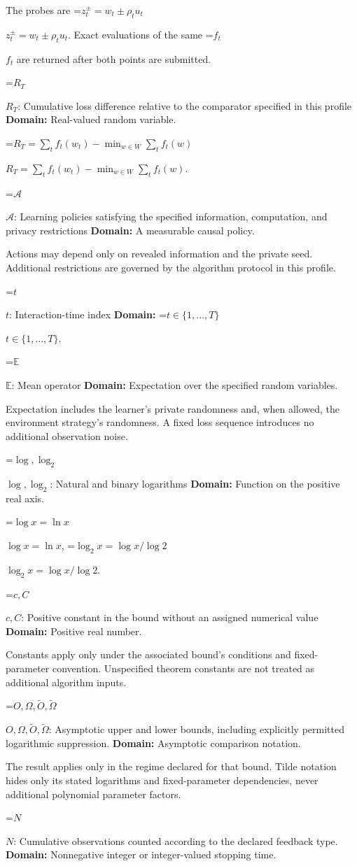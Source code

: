 \documentclass[10pt,a4paper]{article}
\newcommand{\AtlasMath}[1]{\par\begingroup\centering\setbox0=\hbox{$\displaystyle #1$}\ifdim\wd0>1.4\linewidth\typeout{ATLAS WIDE FORMULA: \the\wd0}\fi\ifdim\wd0>\linewidth\resizebox{\linewidth}{!}{\box0}\else\box0\fi\par\endgroup}
\newcommand{\AtlasInlineMath}[1]{\begingroup\setbox0=\hbox{$#1$}\ifdim\wd0>.4\linewidth\endgroup\AtlasMath{#1}\else\endgroup$#1$\fi}
\begin{document}
The probes are \AtlasInlineMath{z_t^\pm=w_t\pm\rho_tu_t}. Exact evaluations of the same \AtlasInlineMath{f_t} are returned after both points are submitted.

\AtlasInlineMath{R_T}: Cumulative loss difference relative to the comparator specified in this profile \textbf{Domain:} Real-valued random variable.

\AtlasInlineMath{R_T=\sum_tf_t(w_t)-\min_{w\in W}\sum_tf_t(w)}.

\AtlasInlineMath{\mathcal A}: Learning policies satisfying the specified information, computation, and privacy restrictions \textbf{Domain:} A measurable causal policy.

Actions may depend only on revealed information and the private seed. Additional restrictions are governed by the algorithm protocol in this profile.

\AtlasInlineMath{t}: Interaction-time index \textbf{Domain:} \AtlasInlineMath{t\in\{1,\ldots,T\}}.

\AtlasInlineMath{\mathbb E}: Mean operator \textbf{Domain:} Expectation over the specified random variables.

Expectation includes the learner's private randomness and, when allowed, the environment strategy's randomness. A fixed loss sequence introduces no additional observation noise.

\AtlasInlineMath{\log,\log_2}: Natural and binary logarithms \textbf{Domain:} Function on the positive real axis.

\AtlasInlineMath{\log x=\ln x}, \AtlasInlineMath{\log_2x=\log x/\log2}.

\AtlasInlineMath{c,C}: Positive constant in the bound without an assigned numerical value \textbf{Domain:} Positive real number.

Constants apply only under the associated bound’s conditions and fixed-parameter convention. Unspecified theorem constants are not treated as additional algorithm inputs.

\AtlasInlineMath{O,\Omega,\widetilde O,\widetilde\Omega}: Asymptotic upper and lower bounds, including explicitly permitted logarithmic suppression. \textbf{Domain:} Asymptotic comparison notation.

The result applies only in the regime declared for that bound. Tilde notation hides only its stated logarithms and fixed-parameter dependencies, never additional polynomial parameter factors.

\AtlasInlineMath{N}: Cumulative observations counted according to the declared feedback type. \textbf{Domain:} Nonnegative integer or integer-valued stopping time.
\end{document}
